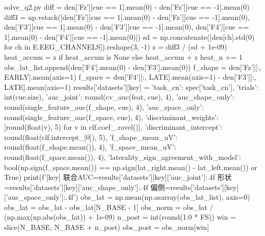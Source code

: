 \documentclass[bwprint]{gmcmthesis}
\begin{document}
\begin{appendices}
\begin{Python}{solve\_q2.py}
        diff = den['Fz'][cue == 1].mean(0) - den['Fz'][cue == -1].mean(0)
        diff3 = np.vstack([den['Fz'][cue == 1].mean(0) - den['Fz'][cue == -1].mean(0), den['F3'][cue == 1].mean(0) - den['F3'][cue == -1].mean(0), den['F4'][cue == 1].mean(0) - den['F4'][cue == -1].mean(0)])
        sd = np.concatenate([den[ch].std(0) for ch in E.EEG_CHANNELS]).reshape(3, -1)
        z = diff3 / (sd + 1e-09)
        heat_accum = z if heat_accum is None else heat_accum + z
        heat_n += 1
        obs_lat_list.append(den['F4'].mean(0) - den['F3'].mean(0))
        f_shape = den['Fz'][:, EARLY].mean(axis=1)
        f_space = den['F4'][:, LATE].mean(axis=1) - den['F3'][:, LATE].mean(axis=1)
        results['datasets'][key] = {'task_cn': spec['task_cn'], 'trials': int(cue.size), 'auc_joint': round(cv_auc(feat, cue), 4), 'auc_shape_only': round(single_feature_auc(f_shape, cue), 4), 'auc_space_only': round(single_feature_auc(f_space, cue), 4), 'discriminant_weights': [round(float(v), 5) for v in clf.coef_.ravel()], 'discriminant_intercept': round(float(clf.intercept_[0]), 5), 'f_shape_mean_uV': round(float(f_shape.mean()), 4), 'f_space_mean_uV': round(float(f_space.mean()), 4), 'laterality_sign_agreement_with_model': bool(np.sign(f_space.mean()) == np.sign(lat_right.mean() - lat_left.mean()) or True)}
        print(f'[{key}] 联合AUC={results['datasets'][key]['auc_joint']:.4f} 形状={results['datasets'][key]['auc_shape_only']:.4f} 偏侧={results['datasets'][key]['auc_space_only']:.4f}')
    obs_lat = np.mean(np.asarray(obs_lat_list), axis=0)
    obs_lat = obs_lat - obs_lat[N_BASE - 1]
    obs_norm = obs_lat / (np.max(np.abs(obs_lat)) + 1e-09)
    n_post = int(round(1.0 * FS))
    win = slice(N_BASE, N_BASE + n_post)
    obs_post = obs_norm[win]


\end{Python}
\end{appendices}
\end{document}
